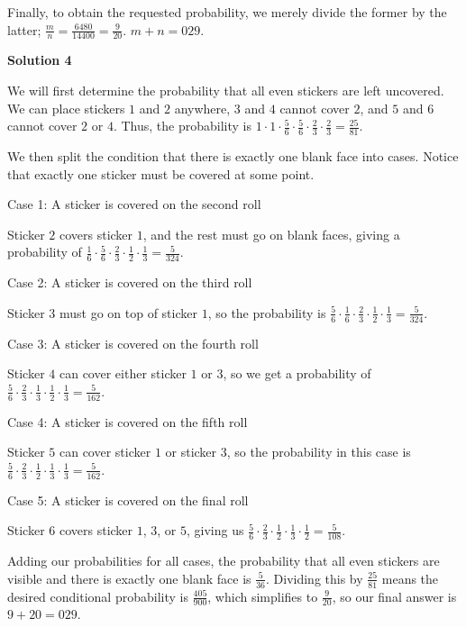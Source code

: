 \begin{enumerate}
 
Finally, to obtain the requested probability, we merely divide the former by the latter; $\frac{m}{n} = \frac{6480}{14400} = \frac{9}{20}$. $m + n = \boxed{029}$.

 



\textbf{Solution 4}

We will first determine the probability that all even stickers are left uncovered. We can place stickers $1$ and $2$ anywhere, $3$ and $4$ cannot cover $2$, and $5$ and $6$ cannot cover $2$ or $4$. Thus, the probability is $1\cdot 1\cdot \frac{5}{6}\cdot \frac{5}{6} \cdot \frac{2}{3}\cdot \frac{2}{3}=\frac{25}{81}$.

 
We then split the condition that there is exactly one blank face into cases. Notice that exactly one sticker must be covered at some point.

 Case 1: A sticker is covered on the second roll

 Sticker $2$ covers sticker $1$, and the rest must go on blank faces, giving a probability of $\frac{1}{6}\cdot \frac{5}{6} \cdot \frac{2}{3}\cdot \frac{1}{2} \cdot \frac{1}{3}= \frac{5}{324}$.

 
Case 2: A sticker is covered on the third roll

 Sticker $3$ must go on top of sticker $1$, so the probability is $\frac{5}{6}\cdot \frac{1}{6} \cdot \frac{2}{3}\cdot \frac{1}{2} \cdot \frac{1}{3}= \frac{5}{324}$.

 
Case 3: A sticker is covered on the fourth roll

 Sticker $4$ can cover either sticker $1$ or $3$, so we get a probability of $\frac{5}{6}\cdot \frac{2}{3} \cdot \frac{1}{3}\cdot \frac{1}{2} \cdot \frac{1}{3}= \frac{5}{162}$.

 
Case 4: A sticker is covered on the fifth roll

 Sticker $5$ can cover sticker $1$ or sticker $3$, so the probability in this case is $\frac{5}{6}\cdot \frac{2}{3} \cdot \frac{1}{2}\cdot \frac{1}{3} \cdot \frac{1}{3}= \frac{5}{162}$.

 
Case 5: A sticker is covered on the final roll

 Sticker $6$ covers sticker $1$, $3$, or $5$, giving us $\frac{5}{6}\cdot \frac{2}{3} \cdot \frac{1}{2}\cdot \frac{1}{3} \cdot \frac{1}{2}= \frac{5}{108}$.

 
Adding our probabilities for all cases, the probability that all even stickers are visible and there is exactly one blank face is $\frac{5}{36}$. Dividing this by $\frac{25}{81}$ means the desired conditional probability is $\frac{405}{900}$, which simplifies to $\frac{9}{20}$, so our final answer is $9+20=\boxed{029}$.


\end{enumerate}
